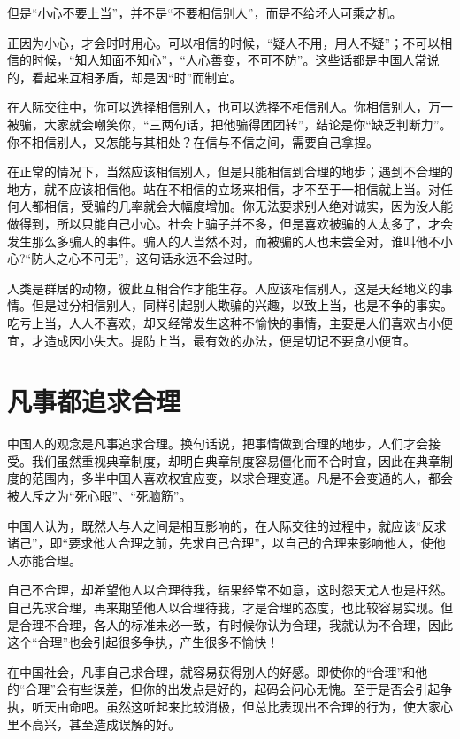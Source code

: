 \documentclass[fontset=fandol, a4paper, 12pt, openright]{ctexbook}
\begin{document}
但是“小心不要上当”，并不是“不要相信别人”，而是不给坏人可乘之机。

正因为小心，才会时时用心。可以相信的时候，“疑人不用，用人不疑”；不可以相信的时候，“知人知面不知心”，“人心善变，不可不防”。这些话都是中国人常说的，看起来互相矛盾，却是因“时”而制宜。

在人际交往中，你可以选择相信别人，也可以选择不相信别人。你相信别人，万一被骗，大家就会嘲笑你，“三两句话，把他骗得团团转”，结论是你“缺乏判断力”。你不相信别人，又怎能与其相处？在信与不信之间，需要自己拿捏。

在正常的情况下，当然应该相信别人，但是只能相信到合理的地步；遇到不合理的地方，就不应该相信他。站在不相信的立场来相信，才不至于一相信就上当。对任何人都相信，受骗的几率就会大幅度增加。你无法要求别人绝对诚实，因为没人能做得到，所以只能自己小心。社会上骗子并不多，但是喜欢被骗的人太多了，才会发生那么多骗人的事件。骗人的人当然不对，而被骗的人也未尝全对，谁叫他不小心?“防人之心不可无”，这句话永远不会过时。

人类是群居的动物，彼此互相合作才能生存。人应该相信别人，这是天经地义的事情。但是过分相信别人，同样引起别人欺骗的兴趣，以致上当，也是不争的事实。吃亏上当，人人不喜欢，却又经常发生这种不愉快的事情，主要是人们喜欢占小便宜，才造成因小失大。提防上当，最有效的办法，便是切记不要贪小便宜。

\section{凡事都追求合理}

中国人的观念是凡事追求合理。换句话说，把事情做到合理的地步，人们才会接受。我们虽然重视典章制度，却明白典章制度容易僵化而不合时宜，因此在典章制度的范围内，多半中国人喜欢权宜应变，以求合理变通。凡是不会变通的人，都会被人斥之为“死心眼”、“死脑筋”。

中国人认为，既然人与人之间是相互影响的，在人际交往的过程中，就应该“反求诸己”，即“要求他人合理之前，先求自己合理”，以自己的合理来影响他人，使他人亦能合理。

自己不合理，却希望他人以合理待我，结果经常不如意，这时怨天尤人也是枉然。自己先求合理，再来期望他人以合理待我，才是合理的态度，也比较容易实现。但是合理不合理，各人的标准未必一致，有时候你认为合理，我就认为不合理，因此这个“合理”也会引起很多争执，产生很多不愉快！

在中国社会，凡事自己求合理，就容易获得别人的好感。即使你的“合理”和他的“合理”会有些误差，但你的出发点是好的，起码会问心无愧。至于是否会引起争执，听天由命吧。虽然这听起来比较消极，但总比表现出不合理的行为，使大家心里不高兴，甚至造成误解的好。
\end{document}

